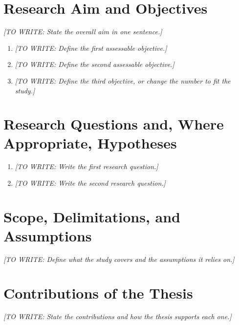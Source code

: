 \documentclass[12pt,a4paper,oneside]{report}
\newif\ifshowguidance
\newcommand{\Guide}[1]{%
  \ifshowguidance
  \begin{tcolorbox}[enhanced,breakable,colback=GuideBlue,
    colframe=GuideBorder,boxrule=0.5pt,arc=1mm,
    title={Writing guide --- replace with your research},
    colbacktitle=ThesisBlue,coltitle=white,fonttitle=\small\bfseries,
    before skip=10pt,after skip=10pt]
    \small #1
  \end{tcolorbox}
  \fi}
\newcommand{\Draft}[1]{\par\noindent\textit{[TO WRITE: #1]}\par}
\begin{document}
\section{Research Aim and Objectives}
\Guide{Give one overarching aim, followed by specific, assessable objectives.
Use verbs such as develop, characterize, compare, estimate, validate, or
explain. Each objective should correspond to work you performed and evidence
you can present; avoid vague objectives such as ``understand everything.''}
\Draft{State the overall aim in one sentence.}
\begin{enumerate}[label=O\arabic*.]
\item \Draft{Define the first assessable objective.}
\item \Draft{Define the second assessable objective.}
\item \Draft{Define the third objective, or change the number to fit the study.}
\end{enumerate}

\section{Research Questions and, Where Appropriate, Hypotheses}
\Guide{Write questions answerable by your design. For hypothesis-driven work,
state the variables, expected relationship, and rationale; statistical null
and alternative hypotheses belong where they aid the analysis. Exploratory,
design, or qualitative research need not invent hypotheses.}
\begin{enumerate}[label=RQ\arabic*.]
\item \Draft{Write the first research question.}
\item \Draft{Write the second research question.}
\end{enumerate}

\section{Scope, Delimitations, and Assumptions}
\Guide{Specify the studied domain, population, geometry, operating range,
time period, datasets, and analysis boundaries as relevant. Delimitations
are deliberate scope choices; limitations are constraints on inference.
State assumptions and justify their intended range of validity.}
\Draft{Define what the study covers and the assumptions it relies on.}

\section{Contributions of the Thesis}
\Guide{List the actual contributions: new evidence, a method, a model,
dataset, implementation, theory, or evaluation. Distinguish a contribution
from a task completed. Describe novelty conservatively relative to prior
work, and identify what you personally contributed in collaborative work.}
\Draft{State the contributions and how the thesis supports each one.}
\end{document}
